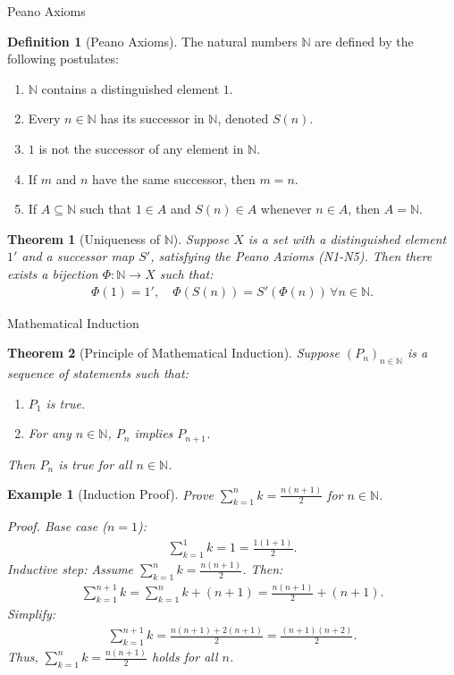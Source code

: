 \documentclass[7pt]{article}
\theoremstyle{definition}
\newtheorem{definition}{Definition}
\theoremstyle{plain}
\newtheorem{theorem}{Theorem}
\newtheorem{example}{Example}
\begin{document}

{Peano Axioms}
\begin{definition}[Peano Axioms]
The natural numbers $ \mathbb{N} $ are defined by the following postulates:
\begin{enumerate}[label=(N\arabic*)]
    \item $ \mathbb{N} $ contains a distinguished element $ 1 $.
    \item Every $ n \in \mathbb{N} $ has its successor in $ \mathbb{N} $, denoted $ S(n) $.
    \item $ 1 $ is not the successor of any element in $ \mathbb{N} $.
    \item If $ m $ and $ n $ have the same successor, then $ m = n $.
    \item If $ A \subseteq \mathbb{N} $ such that $ 1 \in A $ and $ S(n) \in A $ whenever $ n \in A $, then $ A = \mathbb{N} $.
\end{enumerate}
\end{definition}

\begin{theorem}[Uniqueness of $ \mathbb{N} $]
Suppose $ X $ is a set with a distinguished element $ 1' $ and a successor map $ S' $, satisfying the Peano Axioms (N1-N5). Then there exists a bijection $ \Phi : \mathbb{N} \to X $ such that:
\begin{align*}
    \Phi(1) = 1', \quad \Phi(S(n)) = S'(\Phi(n)) \, \forall n \in \mathbb{N}.
\end{align*}
\end{theorem}

{Mathematical Induction}
\begin{theorem}[Principle of Mathematical Induction]
Suppose $ (P_n)_{n \in \mathbb{N}} $ is a sequence of statements such that:
\begin{enumerate}
    \item $ P_1 $ is true.
    \item For any $ n \in \mathbb{N} $, $ P_n $ implies $ P_{n+1} $.
\end{enumerate}
Then $ P_n $ is true for all $ n \in \mathbb{N} $.
\end{theorem}

\begin{example}[Induction Proof]
Prove $ \sum_{k=1}^n k = \frac{n(n+1)}{2} $ for $ n \in \mathbb{N} $.

{Proof.} Base case ($ n=1 $):
\begin{align}
\sum_{k=1}^1 k = 1 = \frac{1(1+1)}{2}.
\end{align}
Inductive step: Assume $ \sum_{k=1}^n k = \frac{n(n+1)}{2} $. Then:
\begin{align}
\sum_{k=1}^{n+1} k = \sum_{k=1}^n k + (n+1) = \frac{n(n+1)}{2} + (n+1).
\end{align}
Simplify:
\begin{align}
\sum_{k=1}^{n+1} k = \frac{n(n+1) + 2(n+1)}{2} = \frac{(n+1)(n+2)}{2}.
\end{align}
Thus, $ \sum_{k=1}^n k = \frac{n(n+1)}{2} $ holds for all $ n $.
\end{example}
\end{document}
